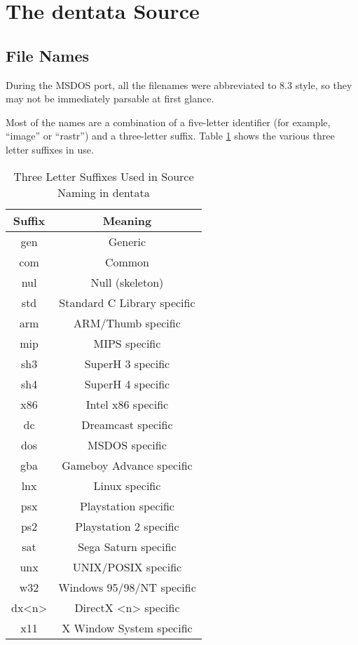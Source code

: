 %
% 
% 
\def\FileCreated{Sat Jun 23 00:06:03 2001}
\def\FileRevised{Sat Jun 23 01:16:20 2001}

\section{The dentata Source}

\subsection{File Names}

During the MSDOS port, all the filenames were abbreviated to
8.3 style, so they may not be immediately parsable at first
glance.

Most of the names are a combination of a five-letter identifier
(for example, ``image'' or ``rastr'') and a three-letter suffix.
Table \ref{tab:tlsuffixes} shows the various three letter suffixes
in use.

\begin{table}[hpt]
\caption{Three Letter Suffixes Used in Source Naming in dentata}
\label{tab:tlsuffixes}
\begin{tabular}{|c|c|}
\hline
Suffix & Meaning \\
\hline\hline
gen & Generic \\
com & Common \\
nul & Null (skeleton) \\
std & Standard C Library specific \\
\hline\hline
arm & ARM/Thumb specific \\
mip & MIPS specific \\
sh3 & SuperH 3 specific \\
sh4 & SuperH 4 specific \\
x86 & Intel x86 specific \\
\hline\hline
dc & Dreamcast specific \\
dos & MSDOS specific \\
gba & Gameboy Advance specific \\
lnx & Linux specific \\
psx & Playstation specific \\
ps2 & Playstation 2 specific \\
sat & Sega Saturn specific \\
unx & UNIX/POSIX specific \\
w32 & Windows 95/98/NT specific \\
\hline\hline
dx<n> & DirectX <n> specific \\
x11 & X Window System specific \\
\hline
\end{tabular}

\end{table}